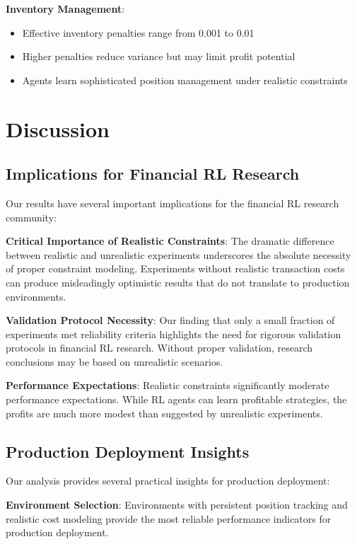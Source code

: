 \documentclass[11pt,a4paper]{article}
\begin{document}
\textbf{Inventory Management}:
\begin{itemize}
\item Effective inventory penalties range from 0.001 to 0.01
\item Higher penalties reduce variance but may limit profit potential
\item Agents learn sophisticated position management under realistic constraints
\end{itemize}

\section{Discussion}
\label{sec:discussion}

\subsection{Implications for Financial RL Research}

Our results have several important implications for the financial RL research community:

\textbf{Critical Importance of Realistic Constraints}: The dramatic difference between realistic and unrealistic experiments underscores the absolute necessity of proper constraint modeling. Experiments without realistic transaction costs can produce misleadingly optimistic results that do not translate to production environments.

\textbf{Validation Protocol Necessity}: Our finding that only a small fraction of experiments met reliability criteria highlights the need for rigorous validation protocols in financial RL research. Without proper validation, research conclusions may be based on unrealistic scenarios.

\textbf{Performance Expectations}: Realistic constraints significantly moderate performance expectations. While RL agents can learn profitable strategies, the profits are much more modest than suggested by unrealistic experiments.

\subsection{Production Deployment Insights}

Our analysis provides several practical insights for production deployment:

\textbf{Environment Selection}: Environments with persistent position tracking and realistic cost modeling provide the most reliable performance indicators for production deployment.
\end{document}
